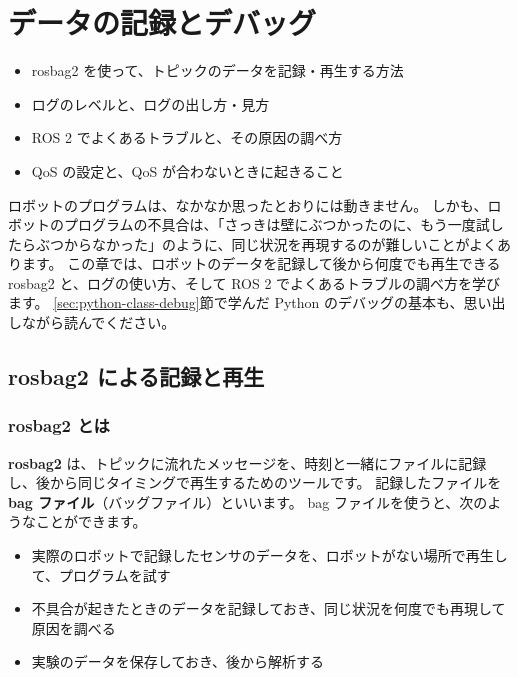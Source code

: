 \chapter{データの記録とデバッグ}
\label{chap:debug}

\begin{goalbox}
  \begin{itemize}
    \item rosbag2 を使って、トピックのデータを記録・再生する方法
    \item ログのレベルと、ログの出し方・見方
    \item ROS 2 でよくあるトラブルと、その原因の調べ方
    \item QoS の設定と、QoS が合わないときに起きること
  \end{itemize}
\end{goalbox}

ロボットのプログラムは、なかなか思ったとおりには動きません。
しかも、ロボットのプログラムの不具合は、「さっきは壁にぶつかったのに、もう一度試したらぶつからなかった」のように、同じ状況を再現するのが難しいことがよくあります。
この章では、ロボットのデータを記録して後から何度でも再生できる rosbag2 と、ログの使い方、そして ROS 2 でよくあるトラブルの調べ方を学びます。
\ref{sec:python-class-debug}節で学んだ Python のデバッグの基本も、思い出しながら読んでください。

\section{rosbag2 による記録と再生}
\label{sec:debug-rosbag}

\subsection{rosbag2 とは}

\textbf{rosbag2} は、トピックに流れたメッセージを、時刻と一緒にファイルに記録し、後から同じタイミングで再生するためのツールです。
記録したファイルを \textbf{bag ファイル}（バッグファイル）といいます。
bag ファイルを使うと、次のようなことができます。

\begin{itemize}
  \item 実際のロボットで記録したセンサのデータを、ロボットがない場所で再生して、プログラムを試す
  \item 不具合が起きたときのデータを記録しておき、同じ状況を何度でも再現して原因を調べる
  \item 実験のデータを保存しておき、後から解析する
\end{itemize}

